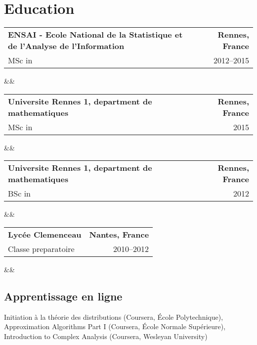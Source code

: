 \documentclass[11pt,a4paper,sans,colorlinks,linkcolor=blue]{moderncv} %
\makeatletter
\renewcommand*{\cventry}[7][.25em]{
  \begin{tabular*}{\textwidth}{l@{\extracolsep{\fill}}r}%
	  {\bfseries #4} & {\bfseries #5} \\%
	  {#3\ifthenelse{\equal{#6}{}}{}{#6}}&{#2}\\%
  \end{tabular*}%
  \ifx&#7&%
    \else{\\\vbox{\small#7}}\fi%
\par\addvspace{#1}}
\makeatother
\begin{document}

\section{Education}
\cventry{2012--2015}{MSc in }{ENSAI - Ecole National de la Statistique et de l'Analyse de l'Information}{Rennes, France}{Filiere genie statistique;}{}
\cventry{2015}{MSc in }{Universite Rennes 1, department de mathematiques}{Rennes, France}{Statistique mathematique;}{}  %
\cventry{2012}{BSc in }{Universite Rennes 1, department de mathematiques}{Rennes, France}{Mathematiques;}{}
\cventry{2010--2012}{Classe preparatoire}{Lyc\'ee Clemenceau}{Nantes, France}{Filiere MPSI - MP}{}

%
%
%
%

\medskip

\subsection{Apprentissage en ligne}
Initiation \`a la th\'eorie des distributions (Coursera, \'Ecole Polytechnique),
Approximation Algorithms Part I (Coursera, \'Ecole Normale Sup\'erieure),
Introduction to Complex Analysis (Coursera, Wesleyan University)

\end{document}
